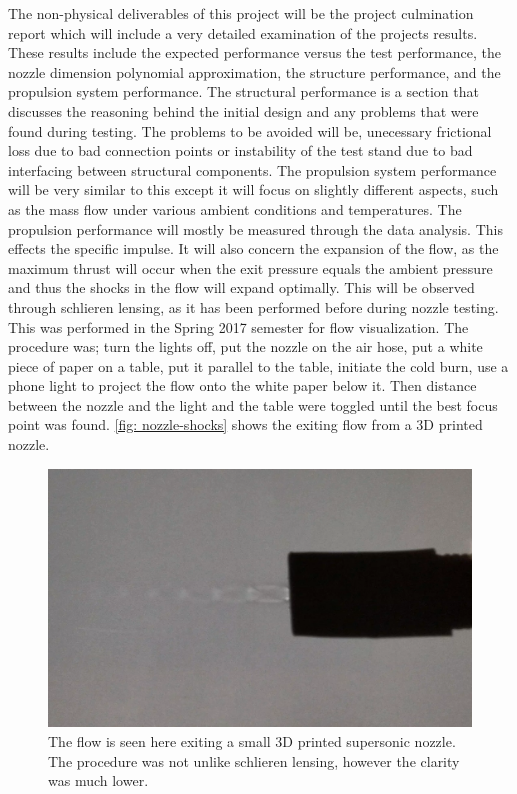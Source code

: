 \documentclass[conference]{IEEEtran} %
\begin{document}
The non-physical deliverables of this project will be the project culmination report which will include a very detailed examination of the projects
results. These results include the expected performance versus the test performance, the nozzle dimension polynomial approximation, the structure performance, and the
propulsion system performance. The structural performance is a section that discusses the reasoning behind the initial design and any problems
that were found during testing. The problems to be avoided will be, unecessary frictional loss due to bad connection points or instability of the test stand due to
bad interfacing between structural components. The propulsion system performance will be very similar to this except it will focus on slightly different aspects, such as
the mass flow under various ambient conditions and temperatures. The propulsion performance will mostly be measured through the data analysis. This effects the
specific impulse. It will also concern the expansion of the flow, as the maximum thrust will occur when the exit pressure equals the ambient pressure and thus the shocks
in the flow will expand optimally. This will be observed through schlieren lensing, as it has been performed before during nozzle testing. This was performed in the Spring 2017
semester for flow visualization. The procedure was; turn the lights off, put the nozzle on the air hose, put a white piece of paper on a table, put it parallel to the table, initiate the cold burn, use a phone light
to project the flow onto the white paper below it. Then distance between the nozzle and the light and the table were toggled until the best focus point was found. \autoref{fig: nozzle-shocks}
shows the exiting flow from a 3D printed nozzle.

\begin{figure}[ht]
  \includegraphics[width=\linewidth]{figs/nozzle-shocks[2].png}
  \caption{The flow is seen here exiting a small 3D printed supersonic nozzle. The procedure was not unlike schlieren lensing, however the clarity was much lower.}
\label{fig: nozzle-shocks}
\end{figure}
\end{document}
